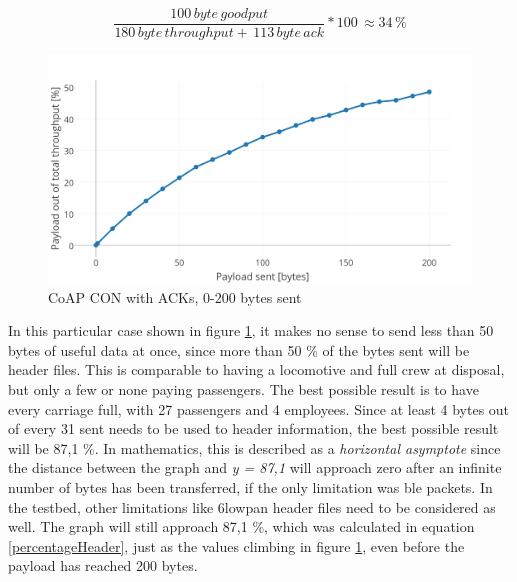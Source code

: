  

\begin{equation} \label{eqCON100byte2}
    \frac{100 \, byte \, goodput}{180 \, byte \, throughput + \, 113 \, byte \, ack}*100 \, \approx 34 \,\%
\end{equation}


\begin{figure}[ht]
    \centering
    \includegraphics[width=1.0\textwidth]{CON0-200withAcks.png}    
    \caption{CoAP CON with ACKs, 0-200 bytes sent}
    \label{fig:coapCON0200}
\end{figure}

\noindent In this particular case shown in figure \ref{fig:coapCON0200}, it makes no sense to send less than 50 bytes of useful data at once, since more than 50 \% of the bytes sent will be header files. This is comparable to having a locomotive and full crew at disposal, but only a few or none paying passengers. The best possible result is to have every carriage full, with 27 passengers and 4 employees. Since at least 4 bytes out of every 31 sent needs to be used to header information, the best possible result will be 87,1 \%. In mathematics, this is described as a \textit{horizontal asymptote} since the distance between the graph and \textit{y = 87,1} will approach zero after an infinite number of bytes has been transferred, if the only limitation was \gls{ble} packets. In the testbed, other limitations like \gls{6lowpan} header files need to be considered as well. The graph will still approach 87,1 \%, which was calculated in equation \ref{percentageHeader}, just as the values climbing in figure \ref{fig:coapCON0200}, even before the \gls{payload} has reached 200 bytes.

